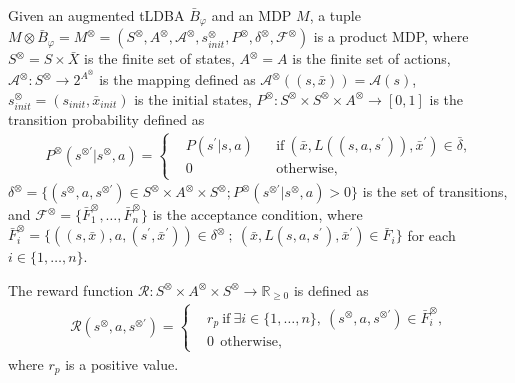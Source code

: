 \documentclass[a4j,12pt,oneside,openany,english]{jsbook}
\begin{document}
\begin{definition}
  Given an augmented tLDBA $\bar{B}_{\varphi}$ and an MDP $M$, a tuple $M \otimes \bar{B}_{\varphi} = M^{\otimes} = (S^{\otimes}, A^{\otimes}, {\mathcal A}^{\otimes}, s_{init}^{\otimes}, P^{\otimes}, \delta^{\otimes}, {\mathcal F}^{\otimes})$ is a product MDP, where
  $S^{\otimes} = S \times \bar{X}$ is the finite set of states, $A^{\otimes}=A$ is the finite set of actions, ${\mathcal A}^{\otimes} : S^{\otimes} \rightarrow 2^{A^{\otimes}}$ is the mapping defined as ${\mathcal A}^{\otimes}((s,\bar{x})) = {\mathcal A}(s)$, $s_{init}^{\otimes} = (s_{init},\bar{x}_{init})$ is the initial states, $P^{\otimes} : S^{\otimes} \times S^{\otimes} \times A^{\otimes} \rightarrow [0,1]$ is the transition probability defined as
  \begin{align}
    P^{\otimes}(s^{\otimes \prime} | s^{\otimes}, a) =
    \left\{
    \begin{aligned}
      &P(s^{\prime} | s, a) &   &\text{if}\  (\bar{x}, L((s,a,s^{\prime})), \bar{x}^{\prime}) \in \bar{\delta},\\
      &0 &   &\text{otherwise} ,
    \end{aligned}
    \right. \nonumber
  \end{align}
  $\delta^{\otimes} = \{ (s^{\otimes}, a, s^{\otimes \prime}) \in S^{\otimes} \times A^{\otimes} \times S^{\otimes} ; P^{\otimes}(s^{\otimes \prime} | s^{\otimes}, a) > 0 \}$ is the set of transitions, and ${\mathcal F}^{\otimes} = \{ \bar{F}^{\otimes}_1, \ldots ,\bar{F}^{\otimes}_n \}$ is the acceptance condition, where $\bar{F}^{\otimes}_i = \{ ((s,\bar{x}), a, (s^{\prime}, \bar{x}^{\prime})) \in \delta^{\otimes}\ ;\ (\bar{x}, L(s,a,s^{\prime}), \bar{x}^{\prime}) \in \bar{F}_i \}$ for each $ i \in \{ 1, \ldots ,n \}$.
\end{definition}

\begin{definition}
  The reward function $\mathcal{R} :S^{\otimes} \times A^{\otimes} \times S^{\otimes} \rightarrow {\mathbb R}_{\geq 0}$ is defined as
  \begin{align}
    \mathcal{R}(s^{\otimes}, a, s^{\otimes \prime}) =
    \left\{
    \begin{aligned}
      &r_p \  \text{if}\ \exists i \in \! \{ 1, \ldots ,n \},\ (s^{\otimes}, a, s^{\otimes \prime}) \in \bar{F}^{\otimes}_i \!,\\
      &0   \ \ \text{otherwise},
    \end{aligned}
    \right. \nonumber
  \end{align}
  where $r_p$ is a positive value.
\end{definition}
\end{document}
